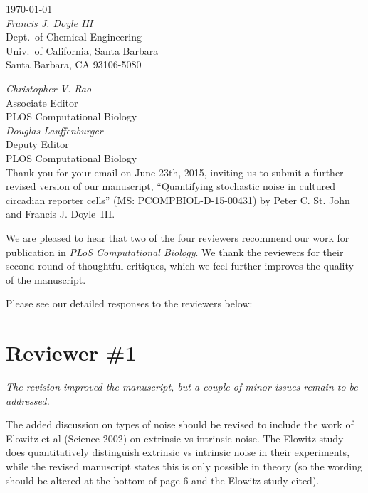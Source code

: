 \documentclass[11pt, letterpaper]{article}
\newenvironment{reviewer}{\itshape\color{gray}}{}
\begin{document}
\begin{flushright}
\today\\[2ex]
{\itshape Francis J. Doyle III}\\
Dept.\ of Chemical Engineering\\
Univ.\ of California, Santa Barbara\\
Santa Barbara, CA 93106-5080\\
\end{flushright}

{\itshape Christopher V. Rao}\\
Associate Editor\\
PLOS Computational Biology\\

{\itshape Douglas Lauffenburger}\\
Deputy Editor\\
PLOS Computational Biology\\

Thank you for your email on June 23th, 2015, inviting us to submit a further revised version of our manuscript, ``Quantifying stochastic noise in cultured circadian reporter cells'' (MS: PCOMPBIOL-D-15-00431) by Peter C. St. John and Francis J. Doyle~III.

We are pleased to hear that two of the four reviewers recommend our work for publication in {\itshape PLoS Computational Biology}. We thank the reviewers for their second round of thoughtful critiques, which we feel further improves the quality of the manuscript.

Please see our detailed responses to the reviewers below: 

\section*{Reviewer \#1}
\begin{reviewer}
The revision improved the manuscript, but a couple of minor issues remain to be addressed.

The added discussion on types of noise should be revised to include the work of Elowitz et al (Science 2002) on extrinsic vs intrinsic noise. The Elowitz study does quantitatively distinguish extrinsic vs intrinsic noise in their experiments, while the revised manuscript states this is only possible in theory (so the wording should be altered at the bottom of page 6 and the Elowitz study cited). 
\end{reviewer}
\end{document}
